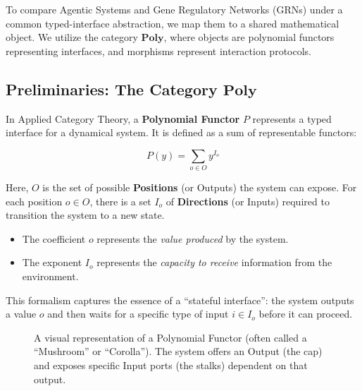 \documentclass[11pt, a4paper]{article}
\newcommand{\Poly}{\mathbf{Poly}}
\begin{document}
To compare Agentic Systems and Gene Regulatory Networks (GRNs) under a common typed-interface abstraction, we map them to a shared mathematical object. We utilize the category $\Poly$, where objects are polynomial functors representing interfaces, and morphisms represent interaction protocols.

\subsection{Preliminaries: The Category $\Poly$}
In Applied Category Theory, a \textbf{Polynomial Functor} $P$ represents a typed interface for a dynamical system. It is defined as a sum of representable functors:

\begin{equation}
    P(y) = \sum_{o \in O} y^{I_o}
\end{equation}

Here, $O$ is the set of possible \textbf{Positions} (or Outputs) the system can expose. For each position $o \in O$, there is a set $I_o$ of \textbf{Directions} (or Inputs) required to transition the system to a new state.
\begin{itemize}
    \item The coefficient $o$ represents the \textit{value produced} by the system.
    \item The exponent $I_o$ represents the \textit{capacity to receive} information from the environment.
\end{itemize}
This formalism captures the essence of a ``stateful interface'': the system outputs a value $o$ and then waits for a specific type of input $i \in I_o$ before it can proceed.

\begin{figure}[h]
    \centering
    \caption{A visual representation of a Polynomial Functor (often called a ``Mushroom'' or ``Corolla''). The system offers an Output (the cap) and exposes specific Input ports (the stalks) dependent on that output.}
    \label{fig:poly_mushroom}
\end{figure}
\end{document}
